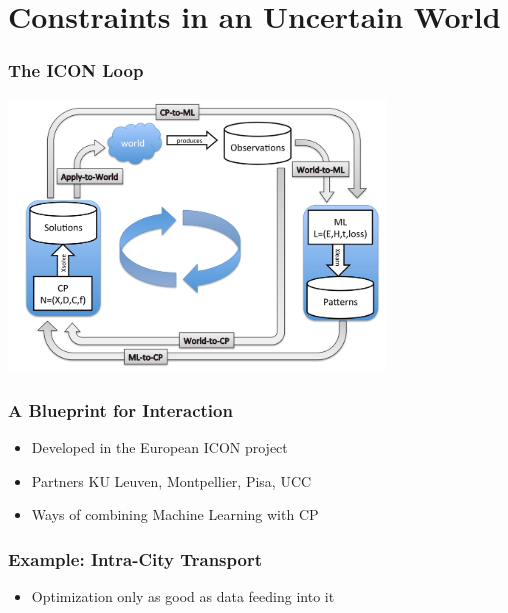\section{Constraints in an Uncertain World}

\begin{frame}
  \frametitle{The ICON Loop}
  \includegraphics[width=10cm]{../methodology/images/iconloop}
\end{frame}

\begin{frame}
  \frametitle{A Blueprint for Interaction}
  \begin{itemize}
  \item Developed in the European ICON project
  \item Partners KU Leuven, Montpellier, Pisa, UCC
    \item Ways of combining Machine Learning with CP
  \end{itemize}
\end{frame}

\begin{frame}
  \frametitle{Example: Intra-City Transport}
  \noindent\begin{itemize}
  \item Optimization only as good as data feeding into it
    \end{itemize}
\end{frame}

